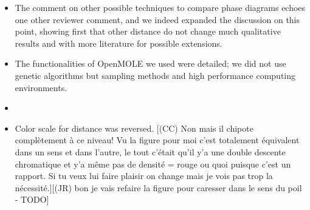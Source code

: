 \documentclass[11pt,a4paper,sans]{moderncv}        %
\begin{document}
\begin{itemize}
	\item The comment on other possible techniques to compare phase diagrams echoes one other reviewer comment, and we indeed expanded the discussion on this point, showing first that other distance do not change much qualitative results and with more literature for possible extensions.
	
	\item The functionalities of OpenMOLE we used were detailed; we did not use genetic algorithms but sampling methods and high performance computing environments.
	
	\item {}
	
    
	\item Color scale for distance was reversed.
    [(CC) Non mais il chipote complètement à ce niveau! Vu la figure pour moi c'est totalement équivalent dans un sens et dans l'autre, le tout c'était qu'il y'a une double descente chromatique et y'a même pas de densité = rouge ou quoi puisque c'est un rapport. Si tu veux lui faire plaisir on change mais je vois pas trop la nécessité.][(JR) bon je vais refaire la figure pour caresser dans le sens du poil - TODO]
	

\end{itemize}
\end{document}
